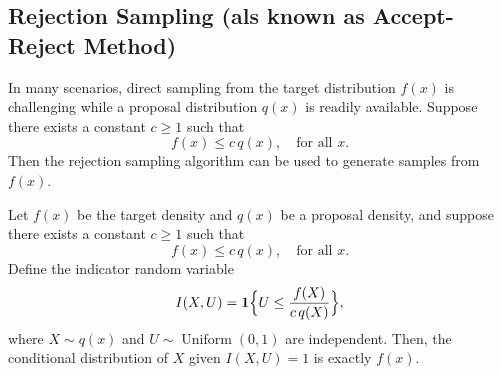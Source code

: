 \documentclass[10pt, headings=standardclasses, parskip=half, twoside]{scrartcl}
\begin{document}
\subsection{Rejection Sampling (als known as Accept-Reject Method)}
\label{subsec:rejection}
In many scenarios, direct sampling from the target distribution \(f(x)\) is challenging while a proposal distribution \(q(x)\) is readily available. Suppose there exists a constant \(c\ge 1\) such that
\[
f(x)\le c\,q(x),\quad \text{for all } x.
\]
Then the rejection sampling algorithm can be used to generate samples from \(f(x)\).
\begin{center}
\end{center}

\begin{theorem}\label{thm:rej}
Let \(f(x)\) be the target density and \(q(x)\) be a proposal density, and suppose there exists a constant \(c\ge 1\) such that
\[
f(x)\le c\,q(x),\quad \text{for all } x.
\]
Define the indicator random variable
\[
I(X,U)=\mathbf{1}\Bigl\{U\le \frac{f(X)}{c\,q(X)}\Bigr\},
\]
where \(X\sim q(x)\) and \(U\sim \operatorname{Uniform}(0,1)\) are independent. Then, the conditional distribution of \(X\) given \(I(X,U)=1\) is exactly \(f(x)\).
\end{theorem}
\end{document}

